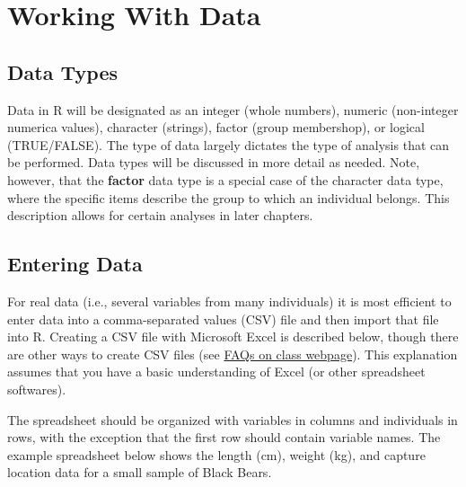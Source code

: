 \documentclass[10pt,openany]{book}\usepackage[]{graphicx}\usepackage[]{color}
\begin{document}
\vspace{-12pt}


\section{Working With Data}
\vspace{-12pt}
\subsection{Data Types}  \label{sect:RDataTypes}
\vspace{-12pt}
Data in R will be designated as an integer (whole numbers), numeric (non-integer numerica values), character (strings), factor (group membershop), or logical (TRUE/FALSE).  The type of data largely dictates the type of analysis that can be performed.  Data types will be discussed in more detail as needed.  Note, however, that the \textbf{factor} data type is a special case of the character data type, where the specific items describe the group to which an individual belongs.  This description allows for certain analyses in later chapters.


\vspace{-12pt}
\subsection{Entering Data}  \label{sect:REnterData}
\vspace{-12pt}
For real data (i.e., several variables from many individuals) it is most efficient to enter data into a comma-separated values (CSV) file and then import that file into R.  Creating a CSV file with Microsoft Excel is described below, though there are other ways to create CSV files (see \href{http://derekogle.com/NCMTH107/resources/FAQ/}{FAQs on class webpage}).  This explanation assumes that you have a basic understanding of Excel (or other spreadsheet softwares).


The spreadsheet should be organized with variables in columns and individuals in rows, with the exception that the first row should contain variable names.  The example spreadsheet below shows the length (cm), weight (kg), and capture location data for a small sample of Black Bears.
\end{document}

